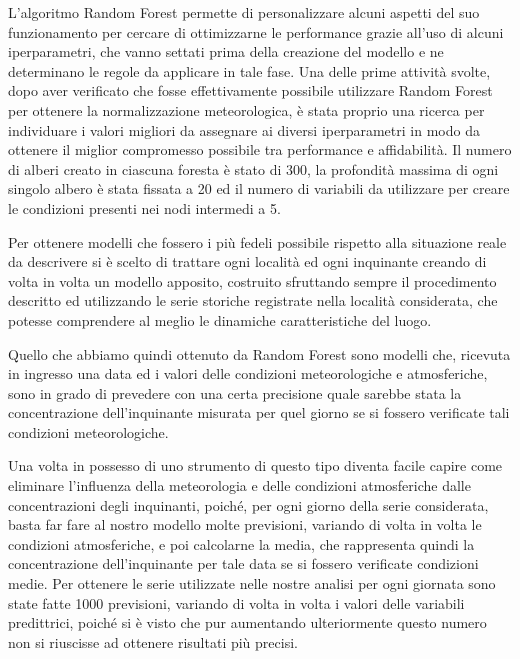 \documentclass[a4paper]{report}
\begin{document}
L'algoritmo Random Forest permette di personalizzare alcuni aspetti del suo funzionamento per cercare di ottimizzarne le performance grazie all'uso di alcuni iperparametri, che vanno settati prima della creazione del modello e ne determinano le regole da applicare in tale fase. Una delle prime attività svolte, dopo aver verificato che fosse effettivamente possibile utilizzare Random Forest per ottenere la normalizzazione meteorologica, è stata proprio una ricerca per individuare i valori migliori da assegnare ai diversi iperparametri in modo da ottenere il miglior compromesso possibile tra performance e affidabilità. Il numero di alberi creato in ciascuna foresta è stato di 300, la profondità massima di ogni singolo albero è stata fissata a 20 ed il numero di variabili da utilizzare per creare le condizioni presenti nei nodi intermedi a 5.

Per ottenere modelli che fossero i più fedeli possibile rispetto alla situazione reale da descrivere si è scelto di trattare ogni località ed ogni inquinante creando di volta in volta un modello apposito, costruito sfruttando sempre il procedimento descritto ed utilizzando le serie storiche registrate nella località considerata, che potesse comprendere al meglio le dinamiche caratteristiche del luogo.

Quello che abbiamo quindi ottenuto da Random Forest sono modelli che, ricevuta in ingresso una data ed i valori delle condizioni meteorologiche e atmosferiche, sono in grado di prevedere con una certa precisione quale sarebbe stata la concentrazione dell'inquinante misurata per quel giorno se si fossero verificate tali condizioni meteorologiche.  

Una volta in possesso di uno strumento di questo tipo diventa facile capire come eliminare l'influenza della meteorologia e delle condizioni atmosferiche dalle concentrazioni degli inquinanti, poiché, per ogni giorno della serie considerata, basta far fare al nostro modello molte previsioni, variando di volta in volta le condizioni atmosferiche, e poi calcolarne la media, che rappresenta quindi la concentrazione dell'inquinante per tale data se si fossero verificate condizioni medie. Per ottenere le serie utilizzate nelle nostre analisi per ogni giornata sono state fatte 1000 previsioni, variando di volta in volta i valori delle variabili predittrici, poiché si è visto che pur aumentando ulteriormente questo numero non si riuscisse ad ottenere risultati più precisi.
\end{document}
